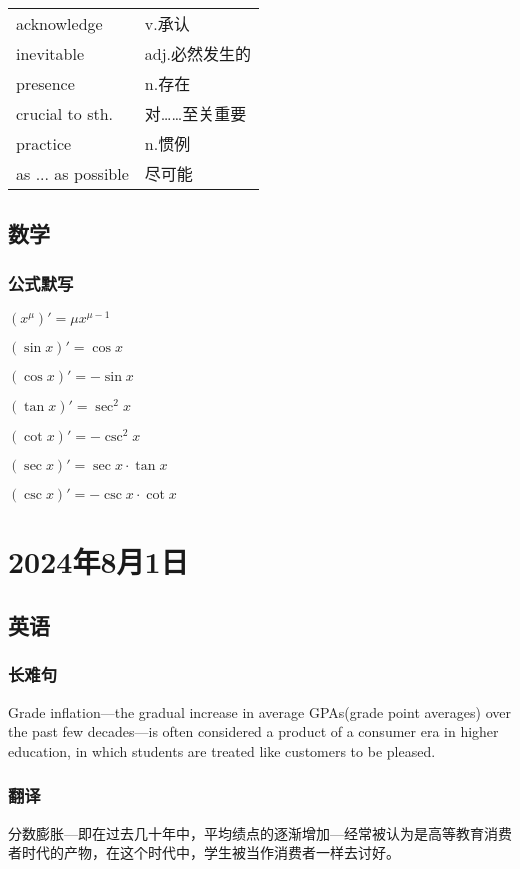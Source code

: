 \documentclass[UTF8]{ctexart}
\begin{document}
\begin{table}[h]
      \centering
      \begin{tabular}{p{}p{}}
            acknowledge        & v.承认      \\
            inevitable         & adj.必然发生的 \\
            presence           & n.存在      \\
            crucial to sth.    & 对……至关重要   \\
            practice           & n.惯例      \\
            as ... as possible & 尽可能
      \end{tabular}
\end{table}


\subsection{数学}
\subsubsection{公式默写}
\begin{multicols}{3}
      ${(x^\mu)}'=\mu x^{\mu-1}$

      ${(\sin x)}'=\cos x$

      ${(\cos x)}'=-\sin x$

      ${(\tan x)}'=\sec^2 x$

      ${(\cot x)}'=-\csc^2 x$

      ${(\sec x)}'=\sec x\cdot\tan x$

      ${(\csc x)}'=-\csc x\cdot\cot x$
\end{multicols}
\section{2024年8月1日}
\subsection{英语}
\subsubsection{长难句}
Grade inflation---the gradual increase in average GPAs(grade point averages) over the past few decades---is often considered a product of a consumer era in higher education, in which students are treated like customers to be pleased.
\subsubsection{翻译}
分数膨胀---即在过去几十年中，平均绩点的逐渐增加---经常被认为是高等教育消费者时代的产物，在这个时代中，学生被当作消费者一样去讨好。
\end{document}
